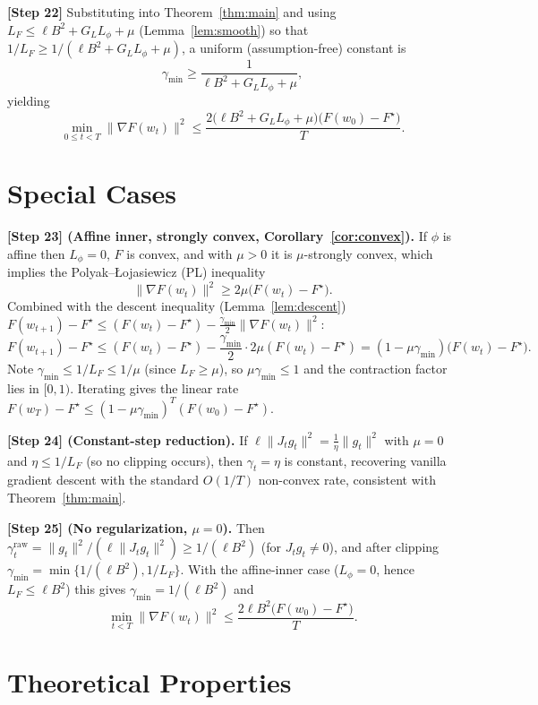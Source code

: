 \documentclass[11pt]{article}
\begin{document}
\textbf{[Step 22]} Substituting into Theorem~\ref{thm:main} and using
$L_F \le \ell B^2 + G_L L_\phi + \mu$ (Lemma~\ref{lem:smooth}) so that
$1/L_F \ge 1/(\ell B^2 + G_L L_\phi + \mu)$, a uniform (assumption-free)
constant is
\[
\gamma_{\min} \ge \frac{1}{\ell B^2 + G_L L_\phi + \mu},
\]
yielding
\[
\min_{0\le t<T}\|\nabla F(w_t)\|^2
\le \frac{2\big(\ell B^2 + G_L L_\phi + \mu\big)\big(F(w_0)-F^\star\big)}{T}.
\]

\section*{Special Cases}

\textbf{[Step 23] (Affine inner, strongly convex, Corollary~\ref{cor:convex}).}
If $\phi$ is affine then $L_\phi = 0$, $F$ is convex, and with $\mu>0$ it is
$\mu$-strongly convex, which implies the Polyak--{\L}ojasiewicz (PL) inequality
\[
\|\nabla F(w_t)\|^2 \ge 2\mu\big(F(w_t)-F^\star\big).
\]
Combined with the descent inequality (Lemma~\ref{lem:descent})
$F(w_{t+1})-F^\star \le (F(w_t)-F^\star) - \tfrac{\gamma_{\min}}{2}\|\nabla F(w_t)\|^2$:
\[
F(w_{t+1})-F^\star
\le (F(w_t)-F^\star) - \frac{\gamma_{\min}}{2}\cdot 2\mu (F(w_t)-F^\star)
= (1-\mu\gamma_{\min})\big(F(w_t)-F^\star\big).
\]
Note $\gamma_{\min}\le 1/L_F \le 1/\mu$ (since $L_F\ge\mu$), so
$\mu\gamma_{\min}\le 1$ and the contraction factor lies in $[0,1)$.
Iterating gives the linear rate
$F(w_T)-F^\star \le (1-\mu\gamma_{\min})^T (F(w_0)-F^\star)$.

\textbf{[Step 24] (Constant-step reduction).}
If $\ell\|J_t g_t\|^2 = \tfrac{1}{\eta}\|g_t\|^2$ with $\mu=0$ and
$\eta \le 1/L_F$ (so no clipping occurs), then $\gamma_t = \eta$ is constant,
recovering vanilla gradient descent with the standard $O(1/T)$ non-convex rate,
consistent with Theorem~\ref{thm:main}.

\textbf{[Step 25] (No regularization, $\mu=0$).}
Then $\gamma_t^{\mathrm{raw}} = \|g_t\|^2/(\ell\|J_t g_t\|^2)\ge 1/(\ell B^2)$
(for $J_t g_t\ne 0$), and after clipping
$\gamma_{\min} = \min\{1/(\ell B^2), 1/L_F\}$. With the affine-inner case
($L_\phi=0$, hence $L_F\le \ell B^2$) this gives $\gamma_{\min}=1/(\ell B^2)$ and
\[
\min_{t<T}\|\nabla F(w_t)\|^2 \le \frac{2\ell B^2\big(F(w_0)-F^\star\big)}{T}.
\]

\section*{Theoretical Properties}
\end{document}
